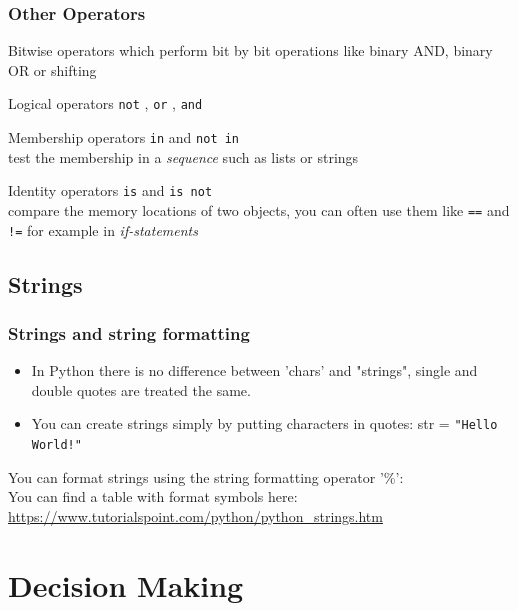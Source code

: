 \documentclass{beamer}
\begin{document}
\begin{frame}
\frametitle{Other Operators}
	\begin{alertblock}{Bitwise operators} 
		which perform bit by bit operations like binary AND, binary OR or shifting
	\end{alertblock}
	\begin{alertblock}{Logical operators} 
		\texttt{not} , \texttt{or} , \texttt{and} \\
	\end{alertblock}
	\begin{alertblock} {Membership operators} 
		\texttt{in} and \texttt{not in} \\test the membership in a \textit{sequence} such as lists or strings
	\end{alertblock}
	\begin{alertblock}{Identity operators} 
		\texttt{is} and \texttt{is not} \\compare the memory locations of two objects, you can often use them like \texttt{==} and \texttt{!=}	for example in \textit{if-statements}
	\end{alertblock}
\end{frame}

\subsection{Strings}

\begin{frame}
\frametitle{Strings and string formatting}
	\begin{itemize}
		\item In Python there is no difference between 'chars' and "strings", single and double quotes are treated the same.
		\item You can create strings simply by putting characters in quotes: str = \texttt{"Hello World!"}
	\end{itemize}
	You can format strings using the string formatting operator '\%': \\
	
	You can find a table with format symbols here: \url{https://www.tutorialspoint.com/python/python_strings.htm}
\end{frame}


\section{Decision Making}
\end{document}
